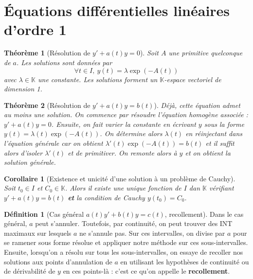 \documentclass[french]{book}
\newcommand{\K}{\mathbb{K}}
\theoremstyle{plain}
\newtheorem{thm}{Théorème}[chapter]
\newtheorem{cor}{Corollaire}[chapter]
\theoremstyle{definition}
\newtheorem{dfn}{Définition}[chapter]
\theoremstyle{remark}
\begin{document}
\section{Équations différentielles linéaires d'ordre 1}
\begin{thm}[Résolution de $y'+a(t)y=0$]
	Soit $A$ une primitive quelconque de $a$. Les solutions sont données par $$\forall t \in I, \ y(t)=\lambda \exp(-A(t))$$ avec $\lambda \in\K$ une constante. Les solutions forment un $\K$-espace vectoriel de dimension 1.
\end{thm}
\begin{thm}[Résolution de $y'+a(t)y=b(t)$]
	Déjà, cette équation admet au moins une solution.
	On commence par résoudre l'équation homogène associée : $y'+a(t)y=0$. Ensuite, on fait varier la constante en écrivant $y$ sous la forme $y(t)=\lambda(t)\exp(-A(t))$. On détermine alors $\lambda(t)$ en réinjectant dans l'équation générale car on obtient $\lambda'(t)\exp(-A(t))=b(t)$ et il suffit alors d'isoler $\lambda'(t)$ et de primitiver. On remonte alors à $y$ et on obtient la solution générale.
\end{thm}
\begin{cor}[Existence et unicité d'une solution à un problème de Cauchy]
	Soit $t_0\in I$ et $C_0\in\K$. Alors il existe une unique fonction de $I$ dan $\K$ vérifiant $y'+a(t)y=b(t)$ \textbf{et} la condition de Cauchy $y(t_0)=C_0$.
\end{cor}
\begin{dfn}[Cas général $a(t)y'+b(t)y=c(t)$, recollement]
	Dans le cas général, $a$ peut s'annuler. Toutefois, par continuité, on peut trouver des INT maximaux sur lesquels $a$ ne s'annule pas. Sur ces intervalles, on divise par $a$ pour se ramener sous forme résolue et appliquer notre méthode sur ces sous-intervalles. Ensuite, lorsqu'on a résolu sur tous les sous-intervalles, on essaye de recoller nos solutions aux points d'annulation de $a$ en utilisant les hypothèses de continuité ou de dérivabilité de $y$ en ces points-là : c'est ce qu'on appelle le \textbf{recollement}.
\end{dfn}
\end{document}
